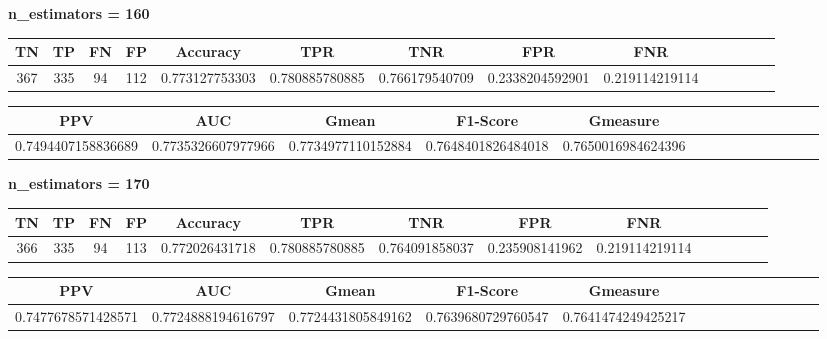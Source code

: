 \documentclass[a4]{article}
\begin{document}
\textbf{n\_estimators = 160}
\begin{center}
\begin{tabular}{|c|c|c|c|c|c|c|c|c|c|c|c|c|c|}
\hline
\multicolumn{1}{|c|}{\textbf{TN}}& \textbf{TP} & \textbf{FN} & \textbf{FP} & \textbf{Accuracy} & \textbf{TPR} & \textbf{TNR} & \textbf{FPR} &\textbf{FNR} \\ \hline
  367 & 335 & 94 & 112 & 0.773127753303 & 0.780885780885 & 0.766179540709 & 0.2338204592901 & 0.219114219114 \\ \hline
\end{tabular}
\end{center}

\begin{center}
\begin{tabular}{|c|c|c|c|c|c|c|c|c|c|c|c|c|c|}
\hline
\multicolumn{1}{|c|}{\textbf{PPV}} & \textbf{AUC} & \textbf{Gmean} & \textbf{F1-Score} & \textbf{Gmeasure}  \\ \hline
  0.7494407158836689 & 0.7735326607977966 & 0.7734977110152884 & 0.7648401826484018 & 0.7650016984624396 \\ \hline
\end{tabular}
\end{center}

\textbf{n\_estimators = 170}
\begin{center}
\begin{tabular}{|c|c|c|c|c|c|c|c|c|c|c|c|c|c|}
\hline
\multicolumn{1}{|c|}{\textbf{TN}}& \textbf{TP} & \textbf{FN} & \textbf{FP} & \textbf{Accuracy} & \textbf{TPR} & \textbf{TNR} & \textbf{FPR} &\textbf{FNR} \\ \hline
  366 & 335 & 94 & 113 & 0.772026431718 & 0.780885780885 & 0.764091858037 & 0.235908141962 & 0.219114219114 \\ \hline
\end{tabular}
\end{center}

\begin{center}
\begin{tabular}{|c|c|c|c|c|c|c|c|c|c|c|c|c|c|}
\hline
\multicolumn{1}{|c|}{\textbf{PPV}} & \textbf{AUC} & \textbf{Gmean} & \textbf{F1-Score} & \textbf{Gmeasure}  \\ \hline
  0.7477678571428571 & 0.7724888194616797 & 0.7724431805849162 & 0.7639680729760547 & 0.7641474249425217 \\ \hline
\end{tabular}
\end{center}

\vspace{5mm}
\end{document}
